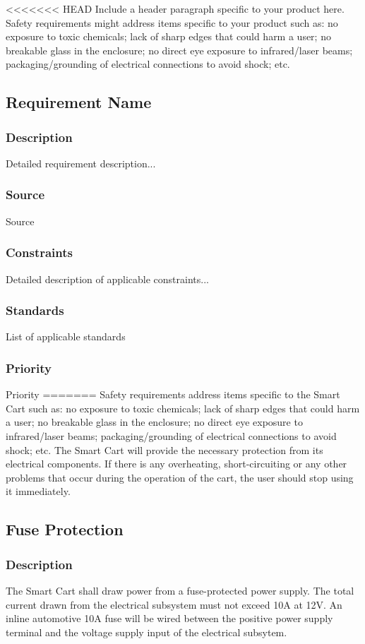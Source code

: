 <<<<<<< HEAD
Include a header paragraph specific to your product here. Safety requirements might address items specific to your product such as: no exposure to toxic chemicals; lack of sharp edges that could harm a user; no breakable glass in the enclosure; no direct eye exposure to infrared/laser beams; packaging/grounding of electrical connections to avoid shock; etc.

\subsection{Requirement Name}
\subsubsection{Description}
Detailed requirement description...
\subsubsection{Source}
Source
\subsubsection{Constraints}
Detailed description of applicable constraints...
\subsubsection{Standards}
List of applicable standards
\subsubsection{Priority}
Priority
=======
Safety requirements address items specific to the Smart Cart such as: no exposure to toxic chemicals; lack of sharp edges that could harm a user; no breakable glass in the enclosure; no direct eye exposure to infrared/laser beams; packaging/grounding of electrical connections to avoid shock; etc. The Smart Cart will provide the necessary protection from its electrical components. If there is any overheating, short-circuiting or any other problems that occur during the operation of the cart, the user should stop using it immediately. 

\subsection{Fuse Protection}
\subsubsection{Description}
The Smart Cart shall draw power from a fuse-protected power supply. The total current drawn from the electrical subsystem must not exceed 10A at 12V. An inline automotive 10A fuse will be wired between the positive power supply terminal and the voltage supply input of the electrical subsytem.
